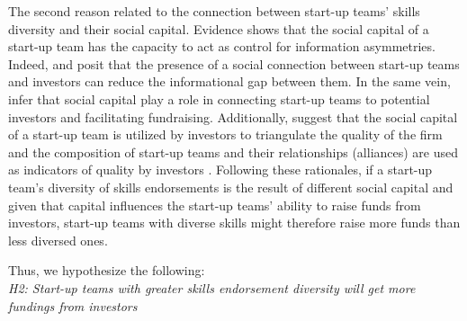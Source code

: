 \documentclass[12pt]{article}
\begin{document}
The second reason related to the connection between start-up teams' skills diversity and their social capital. Evidence shows that the social capital of a start-up team has the capacity to act as control for information asymmetries. Indeed, \citet{huang2017resources} and \citet{shane2002organizational} posit that the presence of a social connection between start-up teams and investors can reduce the informational gap between them. In the same vein, \citet{shane2002network} infer that social capital play a role in connecting start-up teams to potential investors and facilitating fundraising. Additionally, \citet{hoenig2015quality} suggest that the social capital of a start-up team is utilized by investors to triangulate the quality of the firm and the composition of start-up teams and their relationships (alliances) are used as indicators of quality by investors \citep{plummer2016better, semrau2014exactly}. Following these rationales, if a start-up team's diversity of skills endorsements is the result of different social capital and given that capital influences the start-up teams' ability to raise funds from investors, start-up teams with diverse skills might therefore raise more funds than less diversed ones.

Thus, we hypothesize the following: \\

\noindent \textit{H2: Start-up teams with greater skills endorsement diversity will get more fundings from investors} \\
\end{document}
